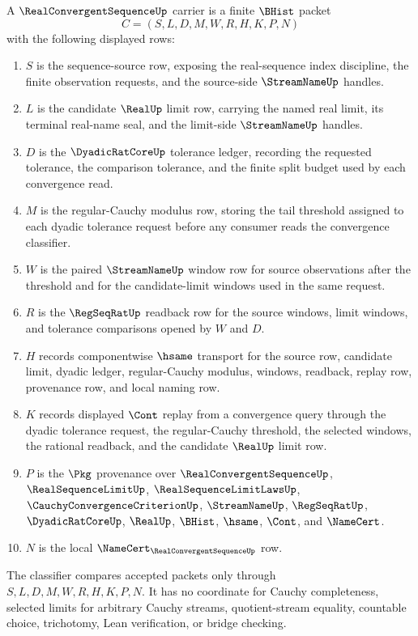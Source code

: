 \begin{definition}\label{def:real-convergent-sequence-carrier}
A $\RealConvergentSequenceUp$ carrier is a finite $\BHist$ packet
$$
C=(S,L,D,M,W,R,H,K,P,N)
$$
with the following displayed rows:
\begin{enumerate}
\item $S$ is the sequence-source row, exposing the real-sequence index discipline, the finite observation requests, and the source-side $\StreamNameUp$ handles.
\item $L$ is the candidate $\RealUp$ limit row, carrying the named real limit, its terminal real-name seal, and the limit-side $\StreamNameUp$ handles.
\item $D$ is the $\DyadicRatCoreUp$ tolerance ledger, recording the requested tolerance, the comparison tolerance, and the finite split budget used by each convergence read.
\item $M$ is the regular-Cauchy modulus row, storing the tail threshold assigned to each dyadic tolerance request before any consumer reads the convergence classifier.
\item $W$ is the paired $\StreamNameUp$ window row for source observations after the threshold and for the candidate-limit windows used in the same request.
\item $R$ is the $\RegSeqRatUp$ readback row for the source windows, limit windows, and tolerance comparisons opened by $W$ and $D$.
\item $H$ records componentwise $\hsame$ transport for the source row, candidate limit, dyadic ledger, regular-Cauchy modulus, windows, readback, replay row, provenance row, and local naming row.
\item $K$ records displayed $\Cont$ replay from a convergence query through the dyadic tolerance request, the regular-Cauchy threshold, the selected windows, the rational readback, and the candidate $\RealUp$ limit row.
\item $P$ is the $\Pkg$ provenance over $\RealConvergentSequenceUp$, $\RealSequenceLimitUp$, $\RealSequenceLimitLawsUp$, $\CauchyConvergenceCriterionUp$, $\StreamNameUp$, $\RegSeqRatUp$, $\DyadicRatCoreUp$, $\RealUp$, $\BHist$, $\hsame$, $\Cont$, and $\NameCert$.
\item $N$ is the local $\NameCert_{\RealConvergentSequenceUp}$ row.
\end{enumerate}
The classifier compares accepted packets only through $S,L,D,M,W,R,H,K,P,N$. It has no coordinate for Cauchy completeness, selected limits for arbitrary Cauchy streams, quotient-stream equality, countable choice, trichotomy, Lean verification, or bridge checking.
\end{definition}

